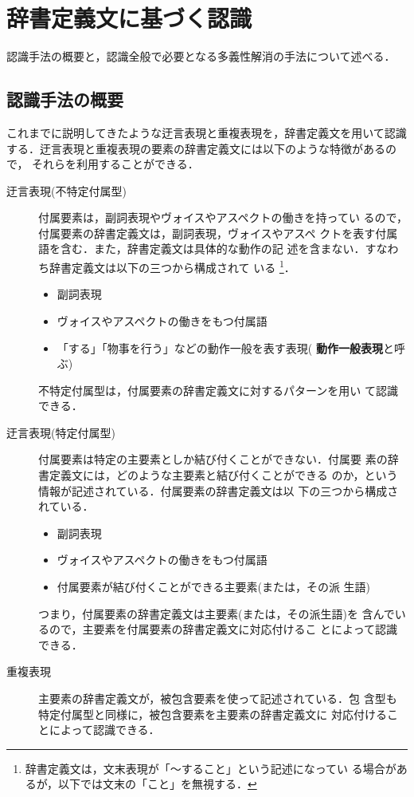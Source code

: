 \documentclass{nlp}
\begin{document}
\section{辞書定義文に基づく認識}
認識手法の概要と，認識全般で必要となる多義性解消の手法について述べる．

\subsection{認識手法の概要}
これまでに説明してきたような迂言表現と重複表現を，辞書定義文を用いて認識
する．迂言表現と重複表現の要素の辞書定義文には以下のような特徴があるので，
それらを利用することができる．
\begin{description}
 \item [迂言表現(不特定付属型)]
	     付属要素は，副詞表現やヴォイスやアスペクトの働きを持ってい
	     るので，付属要素の辞書定義文は，副詞表現，ヴォイスやアスペ
	     クトを表す付属語を含む．また，辞書定義文は具体的な動作の記
	     述を含まない．すなわち辞書定義文は以下の三つから構成されて
	     いる
	     \footnote{
	     辞書定義文は，文末表現が「〜すること」という記述になってい
	     る場合があるが，以下では文末の「こと」を無視する．
	     }．
	     \begin{itemize}
	      \item 副詞表現
	      \item ヴォイスやアスペクトの働きをもつ付属語
	      \item 「する」「物事を行う」などの動作一般を表す表現({\bf
		    動作一般表現}と呼ぶ)
	     \end{itemize}
	     不特定付属型は，付属要素の辞書定義文に対するパターンを用い
	     て認識できる．
	     
 \item [迂言表現(特定付属型)]
	     付属要素は特定の主要素としか結び付くことができない．付属要
	     素の辞書定義文には，どのような主要素と結び付くことができる
	     のか，という情報が記述されている．付属要素の辞書定義文は以
	     下の三つから構成されている．
	     \begin{itemize}
	      \item 副詞表現
	      \item ヴォイスやアスペクトの働きをもつ付属語
	      \item 付属要素が結び付くことができる主要素(または，その派
		    生語)
	     \end{itemize}
	     つまり，付属要素の辞書定義文は主要素(または，その派生語)を
	     含んでいるので，主要素を付属要素の辞書定義文に対応付けるこ
	     とによって認識できる．
       
 \item [重複表現]
	     主要素の辞書定義文が，被包含要素を使って記述されている．包
	     含型も特定付属型と同様に，被包含要素を主要素の辞書定義文に
	     対応付けることによって認識できる．
\end{description}
\end{document}
